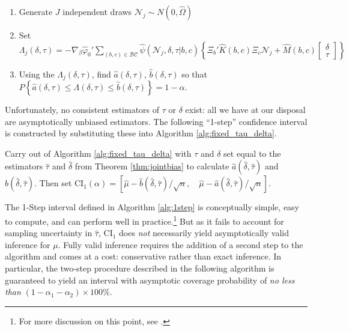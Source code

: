 \begin{alg}
\mbox{}
		\begin{enumerate}
    \item Generate $J$ independent draws $\mathscr{N}_j \sim N(0, \widehat{\Omega})$
			\item Set $\Lambda_j(\delta, \tau)= -\nabla_\beta\widehat{\varphi}_0' \sum_{(b,c) \in \mathcal{BC}} \widehat{\psi}(\mathscr{N}_j,\delta, \tau|b,c) \left\{\Xi_b' \widehat{K}(b,c) \Xi_c \mathscr{N}_j + \widehat{M}(b,c)  \left[\begin{array}{c}\delta \\ \tau \end{array} \right]\right\}$
			\item Using the $\Lambda_j(\delta, \tau)$, find $\widehat{a}(\delta,\tau)$, $\widehat{b}(\delta, \tau)$ so that
		$P\left\{ \widehat{a}(\delta,\tau) \leq\Lambda(\delta,\tau)\leq \widehat{b}(\delta,\tau) \right\} = 1 - \alpha$.
		\end{enumerate}
    \label{alg:fixed_tau_delta}
\end{alg}

Unfortunately, no consistent estimators of $\tau$ or $\delta$ exist: all we have at our disposal are asymptotically unbiased estimators.
The following ``1-step'' confidence interval is constructed by substituting these into Algorithm \ref{alg:fixed_tau_delta}.

\begin{alg} 
  \label{alg:1step}
  Carry out of Algorithm \ref{alg:fixed_tau_delta} with $\tau$ and $\delta$ set equal to the estimators $\widehat{\tau}$ and $\widehat{\delta}$ from Theorem \ref{thm:jointbias} to calculate $\widehat{a}(\widehat{\delta}, \widehat{\tau})$ and $\widehat{b}(\widehat{\delta}, \widehat{\tau})$.
  Then set $\mbox{CI}_{1}(\alpha) = \left[ \widehat{\mu} - \widehat{b}(\widehat{\delta}, \widehat{\tau})/\sqrt{n}, \quad \widehat{\mu} - \widehat{a}(\widehat{\delta}, \widehat{\tau})/\sqrt{n} \right]$.
\end{alg}

The 1-Step interval defined in Algorithm \ref{alg:1step} is conceptually simple, easy to compute, and can perform well in practice.\footnote{For more discussion on this point, see \cite{DiTraglia2016}.}
But as it fails to account for sampling uncertainty in $\widehat{\tau}$, $\mbox{CI}_1$ does \emph{not} necessarily yield asymptotically valid inference for $\mu$.
Fully valid inference requires the addition of a second step to the algorithm and comes at a cost: conservative rather than exact inference.
In particular, the two-step procedure described in the following algorithm is guaranteed to yield an interval with asymptotic coverage probability of \emph{no less than} $(1- \alpha_1 - \alpha_2)\times 100\%$.

